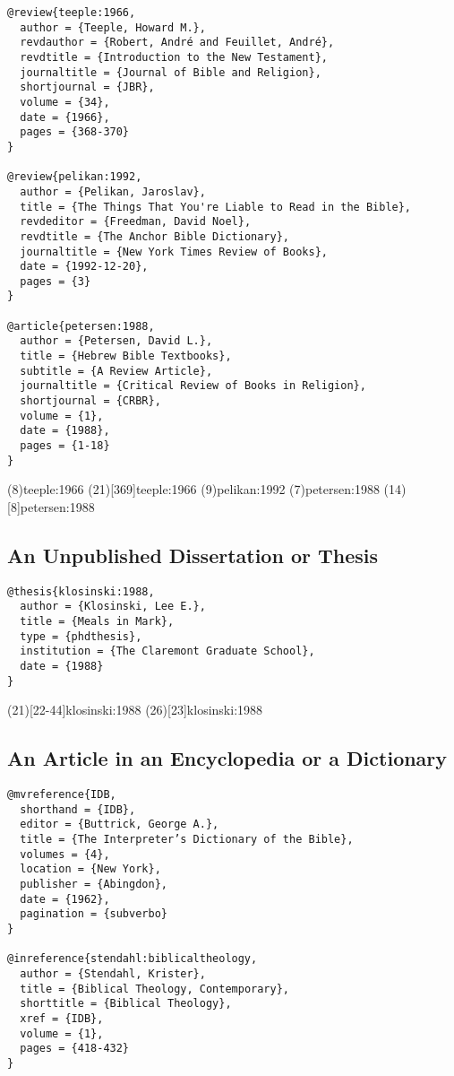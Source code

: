 \documentclass[a4paper]{article}
\begin{document}
\begin{verbatim}
@review{teeple:1966,
  author = {Teeple, Howard M.},
  revdauthor = {Robert, André and Feuillet, André},
  revdtitle = {Introduction to the New Testament},
  journaltitle = {Journal of Bible and Religion},
  shortjournal = {JBR},
  volume = {34},
  date = {1966},
  pages = {368-370}
}

@review{pelikan:1992,
  author = {Pelikan, Jaroslav},
  title = {The Things That You're Liable to Read in the Bible},
  revdeditor = {Freedman, David Noel},
  revdtitle = {The Anchor Bible Dictionary},
  journaltitle = {New York Times Review of Books},
  date = {1992-12-20},
  pages = {3}
}

@article{petersen:1988,
  author = {Petersen, David L.},
  title = {Hebrew Bible Textbooks},
  subtitle = {A Review Article},
  journaltitle = {Critical Review of Books in Religion},
  shortjournal = {CRBR},
  volume = {1},
  date = {1988},
  pages = {1-18}
}
\end{verbatim}

\examplecite(8){teeple:1966}
\examplecite(21)[369]{teeple:1966}
\examplecite(9){pelikan:1992}
\examplecite(7){petersen:1988}
\examplecite(14)[8]{petersen:1988}
\exampleabbreviations
\examplebibliography

\subsection{An Unpublished Dissertation or Thesis}

\begin{verbatim}
@thesis{klosinski:1988,
  author = {Klosinski, Lee E.},
  title = {Meals in Mark},
  type = {phdthesis},
  institution = {The Claremont Graduate School},
  date = {1988}
}
\end{verbatim}

\examplecite(21)[22-44]{klosinski:1988}
\examplecite(26)[23]{klosinski:1988}
\examplebibliography

\subsection{An Article in an Encyclopedia or a Dictionary}

\begin{verbatim}
@mvreference{IDB,
  shorthand = {IDB},
  editor = {Buttrick, George A.},
  title = {The Interpreter’s Dictionary of the Bible},
  volumes = {4},
  location = {New York},
  publisher = {Abingdon},
  date = {1962},
  pagination = {subverbo}
}

@inreference{stendahl:biblicaltheology,
  author = {Stendahl, Krister},
  title = {Biblical Theology, Contemporary},
  shorttitle = {Biblical Theology},
  xref = {IDB},
  volume = {1},
  pages = {418-432}
}
\end{verbatim}
\end{document}
